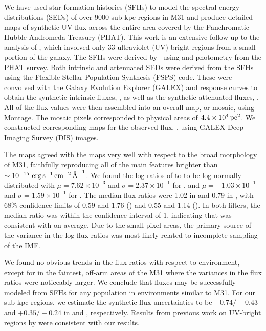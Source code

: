 We have used star formation histories (SFHs) to model the spectral energy
distributions (SEDs) of over 9000 sub-kpc regions in M31 and produce detailed
maps of synthetic UV flux across the entire area covered by the Panchromatic
Hubble Andromeda Treasury (PHAT). This work is an extensive follow-up to the
analysis of \citet{Simones:2014}, which involved only 33 ultraviolet
(UV)-bright regions from a small portion of the galaxy. The SFHs were derived
by \citet{Lewis:2014}\ using \acsb{} and \acsi{} photometry from the PHAT
survey. Both intrinsic and attenuated SEDs were derived from the SFHs using the
Flexible Stellar Population Synthesis (FSPS) code. These were convolved with
the Galaxy Evolution Explorer (GALEX) \fuv{} and \nuv{} response curves to
obtain the synthetic intrinsic fluxes, \fxsfhz{}, as well as the synthetic
attenuated fluxes, \fxsfh{}. All of the flux values were then assembled into an
overall map, or mosaic, using Montage. The mosaic pixels corresponded to
physical areas of $4.4\times 10^4\,\mathrm{pc}^2$. We constructed corresponding maps for
the observed flux, \fxobs{}, using GALEX Deep Imaging Survey (DIS) images.

The \fxsfh{} maps agreed with the \fxobs{} maps very well with respect to the
broad morphology of M31, faithfully reproducing all of the main features
brighter than $\sim 10^{-15}\, \,\mathrm{erg}\,\mathrm{s}^{-1}\,\mathrm{cm}^{-2}\,\textrm{\AA}^{-1}$. We found the log ratios of \fxsfh{} to
\fxobs{} to be log-normally distributed with $\mu = 7.62\times 10^{-3}$ and
$\sigma = 2.37\times 10^{-1}$ for \fuv{}, and $\mu = -1.03\times 10^{-1}$ and
$\sigma = 1.59\times 10^{-1}$ for \nuv{}. The median flux ratios were 1.02 in
\fuv{} and 0.79 in \nuv{}, with 68\% confidence limits of 0.59 and 1.76
(\fuv{}) and 0.55 and 1.14 (\nuv{}). In both filters, the median ratio was
within the confidence interval of 1, indicating that \fxsfh{} was consistent
with \fxobs{} on average. Due to the small pixel areas, the primary source of
the variance in the log flux ratios was most likely related to incomplete
sampling of the IMF.

We found no obvious trends in the flux ratios with respect to environment,
except for in the faintest, off-arm areas of the M31 where the variances in the
flux ratios were noticeably larger. We conclude that fluxes may be successfully
modeled from SFHs for any population in environments similar to M31. For our
sub-kpc regions, we estimate the synthetic flux uncertainties to be
$+\!0.74/\!-\!0.43$ and $+\!0.35/\!-\!0.24$ in \fuv{} and \nuv{}, respectively.
Results from previous work on UV-bright regions by \citet{Simones:2014} were
consistent with our results.

